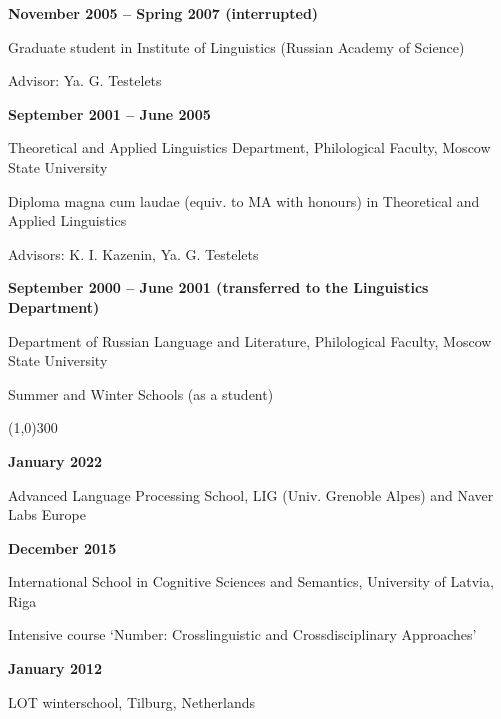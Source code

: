 \documentclass[12pt,letterpaper]{article}
\begin{document}
\vspace{2mm}

\small{
\noindent\textbf{November 2005 -- Spring 2007 (interrupted)}

Graduate student in Institute of Linguistics (Russian Academy of Science)

Advisor: Ya. G. Testelets 
}

\vspace{2mm}

\small{
\noindent\textbf{September 2001 -- June 2005}

Theoretical and Applied Linguistics Department, 
Philological Faculty, Moscow State University

Diploma magna cum laudae (equiv. to MA with honours) 
in Theoretical and Applied Linguistics 

Advisors: K. I. Kazenin, Ya. G. Testelets 
}

\vspace{2mm}

\small{
\noindent\textbf{September 2000 -- June 2001 
(transferred to the Linguistics Department)}

Department of Russian Language and Literature, 
Philological Faculty, Moscow State University
}

\vspace{6mm}

\noindent \Large{Summer and Winter Schools} (as a student)

\vspace{-4mm}
\noindent\line(1,0){300}

\vspace{2mm}

\small{
\noindent\textbf{January 2022}

Advanced Language Processing School,  LIG (Univ. Grenoble Alpes) and Naver Labs Europe 
 
}

\vspace{2mm}

\small{
\noindent\textbf{December 2015}

 International School in Cognitive Sciences and Semantics, University of Latvia, Riga 
 
Intensive course `Number: Crosslinguistic and Crossdisciplinary Approaches'
}

\vspace{2mm}

\small{
\noindent\textbf{January 2012}

LOT winterschool, Tilburg, Netherlands}
\end{document}
